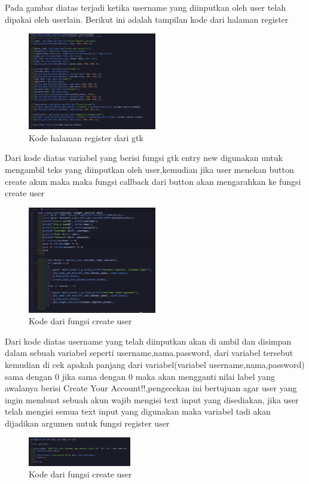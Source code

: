 \documentclass[a4paper,12pt]{article}
\begin{document}
\FloatBarrier
Pada gambar diatas terjadi ketika username yang diinputkan oleh user telah dipakai oleh userlain.
\FloatBarrier
Berikut ini adalah tampilan kode dari halaman register
\begin{figure}[!htbp]
    \centering
    \includegraphics[width=0.5\textwidth]{./img/kode_halaman_register_gtk.png}
    \caption{Kode halaman register dari gtk}
\end{figure}
\FloatBarrier
Dari kode diatas variabel yang berisi fungsi gtk entry new digunakan untuk mengambil teks yang diinputkan oleh user,kemudian jika user menekan button create akun maka
maka fungsi callback dari button akan mengarahkan ke fungsi create user
\begin{figure}[!htbp]
    \centering
    \includegraphics[width=0.5\textwidth]{./img/kode_fungsi_createuser.png}
    \caption{Kode dari fungsi create user}
\end{figure}
\FloatBarrier
Dari kode diatas username yang telah diinputkan akan di ambil dan disimpan dalam sebuah variabel seperti username,nama.password, dari variabel tersebut kemudian di cek apakah
panjang dari variabel(variabel username,nama,password) sama dengan 0 jika sama dengan 0 maka akan mengganti nilai label yang awalanya berisi
Create Your Account!!,pengecekan ini bertujuan agar user yang ingin membuat sebuah akun wajib mengisi text input yang disediakan, jika user telah mengisi
semua text input yang digunakan maka variabel tadi akan dijadikan argumen untuk fungsi register user
\begin{figure}[!htbp]
    \centering
    \includegraphics[width=0.4\textwidth]{./img/register_user.png}
    \caption{Kode dari fungsi create user}
\end{figure}
\end{document}
